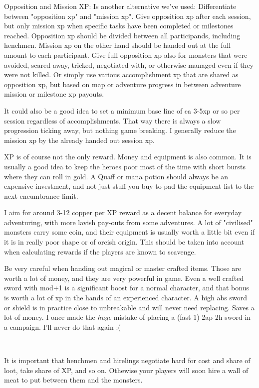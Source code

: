 Opposition and Mission XP:
Is another alternative we've used: Differentiate between "opposition xp" and "mission xp". Give opposition xp after each session, but only mission xp when specific tasks have been completed or milestones reached.
Opposition xp should be divided between all participands, including henchmen. Mission xp on the other hand should be handed out at the full amount to each participant.
Give full opposition xp also for monsters that were avoided, scared away, tricked, negotiated with, or otherwise managed even if they were not killed. Or simply use various accomplishment xp that are shared as opposition xp, but based on map or adventure progress in between adventure mission or milestone xp payouts.

It could also be a good idea to set a minimum base line of ca 3-5xp or so per session regardless of accomplishments. That way there is always a slow progression ticking away, but nothing game breaking. I generally reduce the mission xp by the already handed out session xp.

XP is of course not the only reward. Money and equipment is also common. It is usually a good idea to keep the heroes poor most of the time with short bursts where they can roll in gold. A Quaff or mana potion should always be an expensive investment, and not just stuff you buy to pad the equipment list to the next encumbrance limit.

I aim for around 3-12 copper per XP reward as a decent balance for everyday adventuring, with more lavish pay-outs from some adventures. A lot of "civilised" monsters carry some coin, and their equipment is usually worth a little bit even if it is in really poor shape or of orcish origin. This should be taken into account when calculating rewards if the players are known to scavenge.

Be very careful when handing out magical or master crafted items. Those are worth a lot of money, and they are very powerful in game. Even a well crafted sword with mod+1 is a significant boost for a normal character, and that bonus is worth a lot of xp in the hands of an experienced character. A high abs sword or shield is in practice close to unbreakable and will never need replacing. Saves a lot of money.
I once made the \emph{huge} mistake of placing a (fast 1) 2ap 2h sword in a campaign. I'll never do that again :(

\

It is important that henchmen and hirelings negotiate hard for cost and share of loot, take share of XP, and so on. Othewise your players will soon hire a wall of meat to put between them and the monsters.


